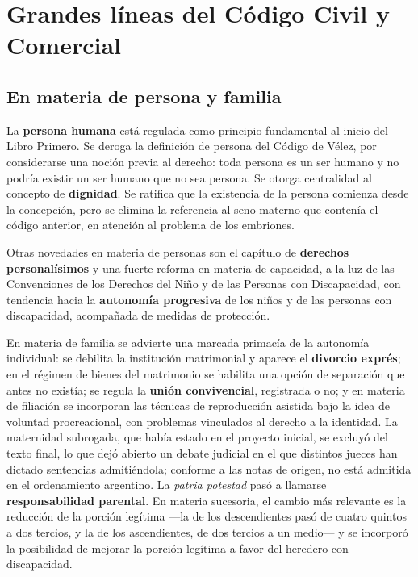 \documentclass[12pt,oneside]{book}
\begin{document}
\section{Grandes líneas del Código Civil y Comercial}

\subsection{En materia de persona y familia}

La \textbf{persona humana} está regulada como principio fundamental al inicio del Libro Primero. Se deroga la definición de persona del Código de Vélez, por considerarse una noción previa al derecho: toda persona es un ser humano y no podría existir un ser humano que no sea persona. Se otorga centralidad al concepto de \textbf{dignidad}. Se ratifica que la existencia de la persona comienza desde la concepción, pero se elimina la referencia al seno materno que contenía el código anterior, en atención al problema de los embriones.

Otras novedades en materia de personas son el capítulo de \textbf{derechos personalísimos} y una fuerte reforma en materia de capacidad, a la luz de las Convenciones de los Derechos del Niño y de las Personas con Discapacidad, con tendencia hacia la \textbf{autonomía progresiva} de los niños y de las personas con discapacidad, acompañada de medidas de protección.

En materia de familia se advierte una marcada primacía de la autonomía individual: se debilita la institución matrimonial y aparece el \textbf{divorcio exprés}; en el régimen de bienes del matrimonio se habilita una opción de separación que antes no existía; se regula la \textbf{unión convivencial}, registrada o no; y en materia de filiación se incorporan las técnicas de reproducción asistida bajo la idea de voluntad procreacional, con problemas vinculados al derecho a la identidad. La maternidad subrogada, que había estado en el proyecto inicial, se excluyó del texto final, lo que dejó abierto un debate judicial en el que distintos jueces han dictado sentencias admitiéndola; conforme a las notas de origen, no está admitida en el ordenamiento argentino. %
La \textit{patria potestad} pasó a llamarse \textbf{responsabilidad parental}. En materia sucesoria, el cambio más relevante es la reducción de la porción legítima ---la de los descendientes pasó de cuatro quintos a dos tercios, y la de los ascendientes, de dos tercios a un medio--- y se incorporó la posibilidad de mejorar la porción legítima a favor del heredero con discapacidad.
\end{document}
